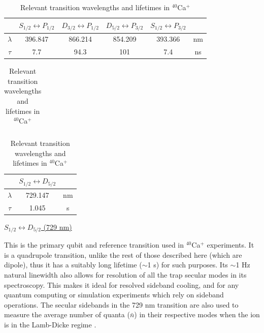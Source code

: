 \begin{table}
\caption{Relevant transition wavelengths and lifetimes in $^{40}$Ca$^+$ \cite{James98.APB.66.181}}
\begin{center}

\begin{tabular}{|c|c|c|c|c|c|}
\hline
  & $S_{1/2} \leftrightarrow P_{1/2}$ & $D_{3/2} \leftrightarrow P_{1/2}$ & $D_{5/2} \leftrightarrow P_{3/2}$ & $S_{1/2} \leftrightarrow P_{3/2}$ & \\ \hline
$\lambda$ & 396.847 & 866.214 & 854.209 & 393.366 & nm \\ \hline
$\tau$ & 7.7 & 94.3 & 101 & 7.4  & ns \\
\hline
\end{tabular}

\begin{tabular}{c}
\\
\end{tabular}

\begin{tabular}{|c|c|c|}
\hline
 & $S_{1/2} \leftrightarrow D_{5/2}$ & \\ \hline
$\lambda$ & 729.147 & nm \\ \hline
$\tau$ & 1.045 & s \\
\hline 
\end{tabular}
\end{center}
\label{table:CaTransitions}
\end{table}  

\hfill
\noindent
\begin{flushleft}
\underline{$S_{1/2} \leftrightarrow D_{5/2}$ (729 nm)   }
\end{flushleft}  
This is the primary qubit and reference transition used in $^{40}$Ca$^+$ experiments. It is a quadrupole transition, unlike the rest of those described here (which are dipole), thus it has a suitably long lifetime ($\sim$1 s) for such purposes. Its $\sim$1 Hz natural linewidth also allows for resolution of all the trap secular modes in its spectroscopy. This makes it ideal for resolved sideband cooling, and for any quantum computing or simulation experiments which rely on sideband operations. The secular sidebands in the 729 nm transition are also used to measure the average number of quanta ($\bar{n}$) in their respective modes when the ion is in the Lamb-Dicke regime \cite{Turchette.PRA.61.063418}. 

